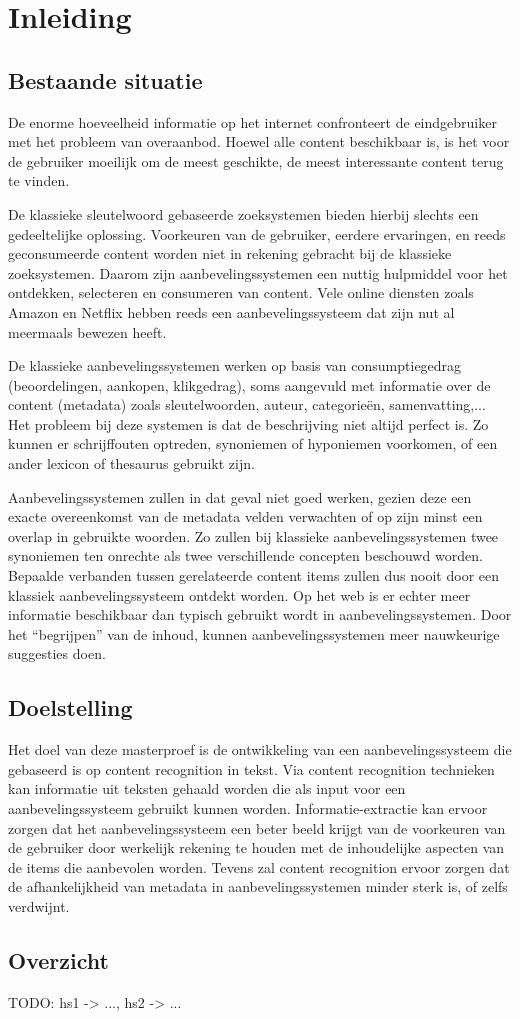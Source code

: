\chapter{Inleiding}

\section{Bestaande situatie}
De enorme hoeveelheid informatie op het internet confronteert de eindgebruiker met het probleem van overaanbod.
Hoewel alle content beschikbaar is, is het voor de gebruiker moeilijk om de meest geschikte, de meest interessante
content terug te vinden. 

De klassieke sleutelwoord gebaseerde zoeksystemen bieden hierbij slechts een gedeeltelijke
oplossing. Voorkeuren van de gebruiker, eerdere ervaringen, en reeds geconsumeerde content worden niet in
rekening gebracht bij de klassieke zoeksystemen. Daarom zijn aanbevelingssystemen een nuttig hulpmiddel voor het
ontdekken, selecteren en consumeren van content. Vele online diensten zoals Amazon \cite{Everything2012} en Netflix \cite{Bennett2007} hebben
reeds een aanbevelingssysteem dat zijn nut al meermaals bewezen heeft. 

De klassieke aanbevelingssystemen werken op basis van consumptiegedrag (beoordelingen, aankopen, klikgedrag),
soms aangevuld met informatie over de content (metadata) zoals sleutelwoorden, auteur, categorie\"en, samenvatting,... Het probleem bij deze systemen is dat de beschrijving niet altijd perfect is. Zo kunnen er schrijffouten optreden, synoniemen of hyponiemen voorkomen, of een ander lexicon of thesaurus gebruikt zijn.

Aanbevelingssystemen zullen in dat geval niet goed werken, gezien deze een exacte overeenkomst van de metadata
velden verwachten of op zijn minst een overlap in gebruikte woorden. Zo zullen bij klassieke aanbevelingssystemen
twee synoniemen ten onrechte als twee verschillende concepten beschouwd worden. Bepaalde verbanden tussen
gerelateerde content items zullen dus nooit door een klassiek aanbevelingssysteem ontdekt worden.
Op het web is er echter meer informatie beschikbaar dan typisch gebruikt wordt in aanbevelingssystemen. Door het
“begrijpen” van de inhoud, kunnen aanbevelingssystemen meer nauwkeurige suggesties doen.

\section{Doelstelling}
Het doel van deze masterproef is de ontwikkeling van een aanbevelingssysteem die gebaseerd is op content
recognition in tekst. Via content recognition technieken kan informatie uit teksten gehaald worden die als input voor
een aanbevelingssysteem gebruikt kunnen worden. Informatie-extractie kan ervoor zorgen dat het
aanbevelingssysteem een beter beeld krijgt van de voorkeuren van de gebruiker door werkelijk rekening te houden
met de inhoudelijke aspecten van de items die aanbevolen worden. Tevens zal content recognition ervoor zorgen dat
de afhankelijkheid van metadata in aanbevelingssystemen minder sterk is, of zelfs verdwijnt.

\section{Overzicht}
TODO: hs1 -> ..., hs2 -> ...